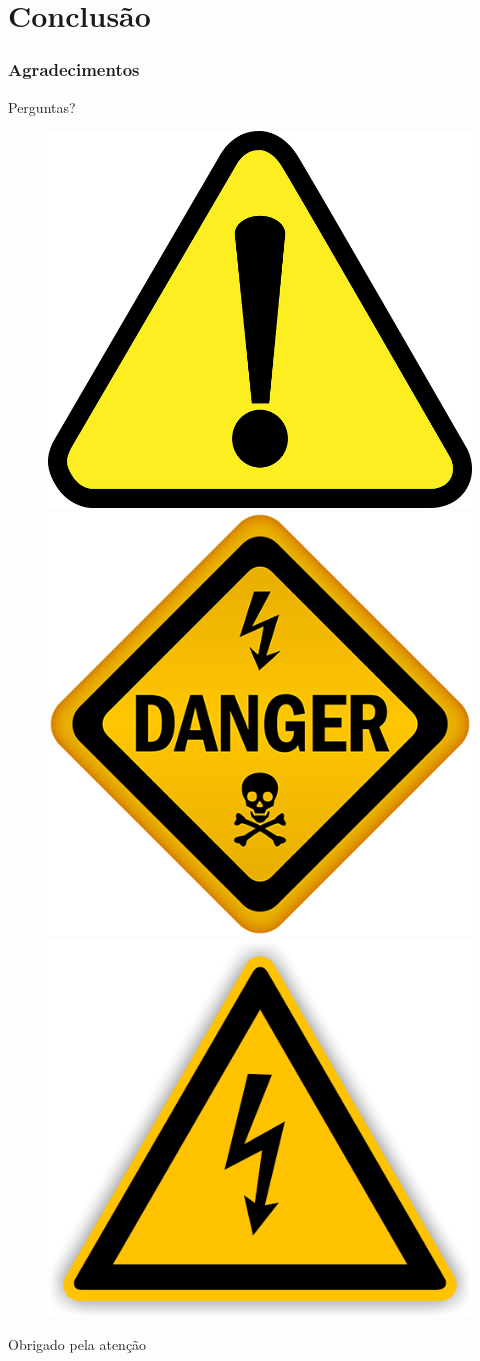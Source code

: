 \documentclass[12pt]{beamer}
\begin{document}
\section{Conclusão}
\begin{frame}
    \frametitle{Agradecimentos}
    \centering
    \Huge{Perguntas?}
    \begin{figure}
        \centering
        \includegraphics[width=.25\textwidth]{alerta.png}
        \includegraphics[width=.25\textwidth]{perigo.png}
        \includegraphics[width=.25\textwidth]{eletricidade.png}
    \end{figure}
    \Huge{Obrigado pela atenção}
\end{frame}
\end{document}
